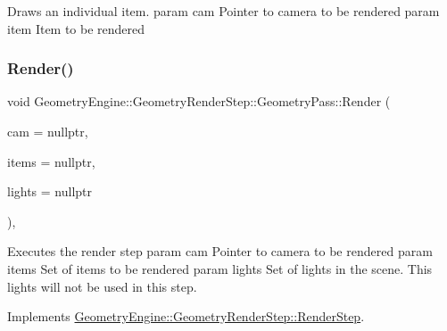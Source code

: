Draws an individual item. param cam Pointer to camera to be rendered param item Item to be rendered \mbox{\label{class_geometry_engine_1_1_geometry_render_step_1_1_geometry_pass_ac3bfd0a3915cd8a8cd7e1bf81157f6ad}} 
\subsubsection{\texorpdfstring{Render()}{Render()}}
{\footnotesize\ttfamily void Geometry\+Engine\+::\+Geometry\+Render\+Step\+::\+Geometry\+Pass\+::\+Render (\begin{DoxyParamCaption}\item[{\mbox{\hyperlink{class_geometry_engine_1_1_geometry_world_item_1_1_geometry_camera_1_1_camera}{Geometry\+World\+Item\+::\+Geometry\+Camera\+::\+Camera}} $\ast$}]{cam = {\ttfamily nullptr},  }\item[{std\+::unordered\+\_\+set$<$ \mbox{\hyperlink{class_geometry_engine_1_1_geometry_world_item_1_1_geometry_item_1_1_geometry_item}{Geometry\+World\+Item\+::\+Geometry\+Item\+::\+Geometry\+Item}} $\ast$ $>$ $\ast$}]{items = {\ttfamily nullptr},  }\item[{std\+::unordered\+\_\+set$<$ \mbox{\hyperlink{class_geometry_engine_1_1_geometry_world_item_1_1_geometry_light_1_1_light}{Geometry\+World\+Item\+::\+Geometry\+Light\+::\+Light}} $\ast$ $>$ $\ast$}]{lights = {\ttfamily nullptr} }\end{DoxyParamCaption})\hspace{0.3cm}{\ttfamily [override]}, {\ttfamily [virtual]}}

Executes the render step param cam Pointer to camera to be rendered param items Set of items to be rendered param lights Set of lights in the scene. This lights will not be used in this step. 

Implements \mbox{\hyperlink{class_geometry_engine_1_1_geometry_render_step_1_1_render_step_a9b054ee8f38304319a9d03ba3e173dcd}{Geometry\+Engine\+::\+Geometry\+Render\+Step\+::\+Render\+Step}}.

\mbox{\label{class_geometry_engine_1_1_geometry_render_step_1_1_geometry_pass_a2929c4675eb93efd992739baac565425}} 
